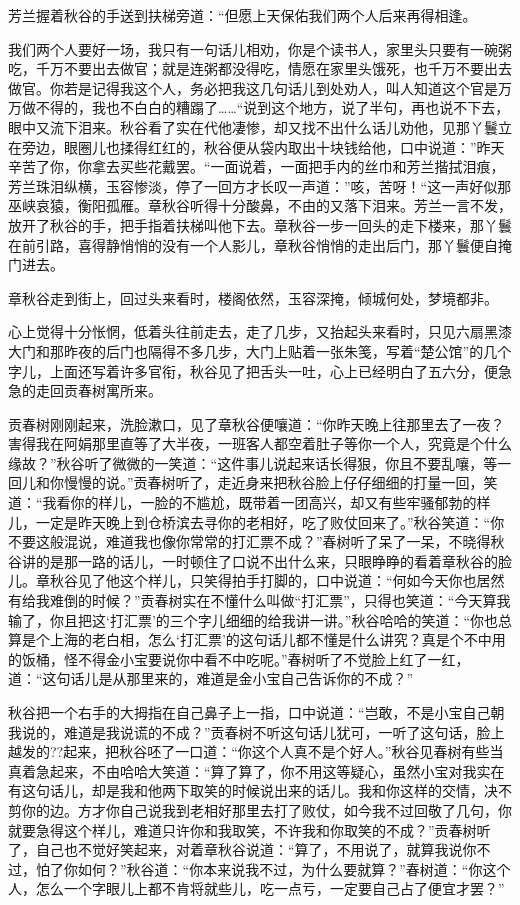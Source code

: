 \documentclass[12pt,UTF8]{ctexbook}
\begin{document}
{{{芳兰握着秋谷的手送到扶梯旁道：“但愿上天保佑我们两个人后来再得相逢。

我们两个人要好一场，我只有一句话儿相劝，你是个读书人，家里头只要有一碗粥吃，千万不要出去做官；就是连粥都没得吃，情愿在家里头饿死，也千万不要出去做官。你若是记得我这个人，务必把我这几句话儿到处劝人，叫人知道这个官是万万做不得的，我也不白白的糟蹋了……“说到这个地方，说了半句，再也说不下去，眼中又流下泪来。秋谷看了实在代他凄惨，却又找不出什么话儿劝他，见那丫鬟立在旁边，眼圈儿也揉得红红的，秋谷便从袋内取出十块钱给他，口中说道：”昨天辛苦了你，你拿去买些花戴罢。“一面说着，一面把手内的丝巾和芳兰揩拭泪痕，芳兰珠泪纵横，玉容惨淡，停了一回方才长叹一声道：”咳，苦呀！“这一声好似那巫峡哀猿，衡阳孤雁。章秋谷听得十分酸鼻，不由的又落下泪来。芳兰一言不发，放开了秋谷的手，把手指着扶梯叫他下去。章秋谷一步一回头的走下楼来，那丫鬟在前引路，喜得静悄悄的没有一个人影儿，章秋谷悄悄的走出后门，那丫鬟便自掩门进去。

章秋谷走到街上，回过头来看时，楼阁依然，玉容深掩，倾城何处，梦境都非。

心上觉得十分怅惘，低着头往前走去，走了几步，又抬起头来看时，只见六扇黑漆大门和那昨夜的后门也隔得不多几步，大门上贴着一张朱笺，写着“楚公馆”的几个字儿，上面还写着许多官衔，秋谷见了把舌头一吐，心上已经明白了五六分，便急急的走回贡春树寓所来。

贡春树刚刚起来，洗脸漱口，见了章秋谷便嚷道：“你昨天晚上往那里去了一夜？害得我在阿娟那里直等了大半夜，一班客人都空着肚子等你一个人，究竟是个什么缘故？”秋谷听了微微的一笑道：“这件事儿说起来话长得狠，你且不要乱嚷，等一回儿和你慢慢的说。”贡春树听了，走近身来把秋谷脸上仔仔细细的打量一回，笑道：“我看你的样儿，一脸的不尴尬，既带着一团高兴，却又有些牢骚郁勃的样儿，一定是昨天晚上到仓桥滨去寻你的老相好，吃了败仗回来了。”秋谷笑道：“你不要这般混说，难道我也像你常常的打汇票不成？”春树听了呆了一呆，不晓得秋谷讲的是那一路的话儿，一时顿住了口说不出什么来，只眼睁睁的看着章秋谷的脸儿。章秋谷见了他这个样儿，只笑得拍手打脚的，口中说道：“何如今天你也居然有给我难倒的时候？”贡春树实在不懂什么叫做“打汇票”，只得也笑道：“今天算我输了，你且把这‘打汇票’的三个字儿细细的给我讲一讲。”秋谷哈哈的笑道：“你也总算是个上海的老白相，怎么‘打汇票’的这句话儿都不懂是什么讲究？真是个不中用的饭桶，怪不得金小宝要说你中看不中吃呢。”春树听了不觉脸上红了一红，道：“这句话儿是从那里来的，难道是金小宝自己告诉你的不成？”

秋谷把一个右手的大拇指在自己鼻子上一指，口中说道：“岂敢，不是小宝自己朝我说的，难道是我说谎的不成？”贡春树不听这句话儿犹可，一听了这句话，脸上越发的??起来，把秋谷呸了一口道：“你这个人真不是个好人。”秋谷见春树有些当真着急起来，不由哈哈大笑道：“算了算了，你不用这等疑心，虽然小宝对我实在有这句话儿，却是我和他两下取笑的时候说出来的话儿。我和你这样的交情，决不剪你的边。方才你自己说我到老相好那里去打了败仗，如今我不过回敬了几句，你就要急得这个样儿，难道只许你和我取笑，不许我和你取笑的不成？”贡春树听了，自己也不觉好笑起来，对着章秋谷说道：“算了，不用说了，就算我说你不过，怕了你如何？”秋谷道：“你本来说我不过，为什么要就算？”春树道：“你这个人，怎么一个字眼儿上都不肯将就些儿，吃一点亏，一定要自己占了便宜才罢？”

}}}
\end{document}
